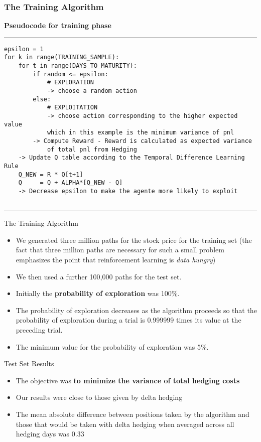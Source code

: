 \documentclass[11pt]{beamer}
\begin{document}
\begin{frame}[fragile]
\frametitle{The Training Algorithm}
\scriptsize
\textbf{Pseudocode for training phase}
\rule{\textwidth}{1pt}
\begin{verbatim}
epsilon = 1
for k in range(TRAINING_SAMPLE):
	for t in range(DAYS_TO_MATURITY):
		if random <= epsilon:
			# EXPLORATION
			-> choose a random action
		else: 
	    	# EXPLOITATION
	    	-> choose action corresponding to the higher expected value
	    	which in this example is the minimum variance of pnl
		-> Compute Reward - Reward is calculated as expected variance 
			of total pnl from Hedging
    -> Update Q table according to the Temporal Difference Learning Rule 
    Q_NEW = R * Q[t+1]
    Q     = Q + ALPHA*[Q_NEW - Q]
    -> Decrease epsilon to make the agente more likely to exploit   		    
	    			
\end{verbatim}
\rule{\textwidth}{1pt}
\end{frame}
\begin{frame}{The Training Algorithm}
	\begin{itemize}
		\item We generated three million paths for the stock price for the training set (the fact that three million paths are necessary for such a small problem emphasizes the point that reinforcement learning is \textit{data hungry}) 
		\item We then used a further 100,000 paths for the test set. 
		\item Initially the \textbf{probability of exploration} was 100\%. 
		\item The probability of exploration decreases as the algorithm proceeds so that the probability of exploration during a trial is 0.999999 times its value at the preceding trial.
		\item The minimum value for the probability of exploration was 5\%.
	\end{itemize}
\end{frame}
\begin{frame}{Test Set Results}
	\begin{itemize}
		\item The objective was \textbf{to minimize the variance of total hedging costs}
		\item Our results were close to those given by delta hedging
		\item The mean absolute difference between positions taken by the algorithm and those that would be taken with delta hedging when averaged across all hedging days was 0.33
	\end{itemize}
\end{frame}
\end{document}
